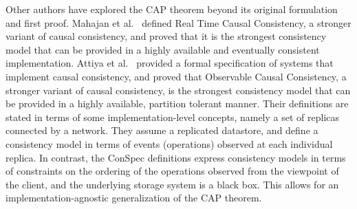 \documentclass[journal,compsoc]{IEEEtran}
\begin{document}
Other authors have explored the CAP theorem beyond its original formulation and first proof.
Mahajan et al.~\cite{mahajan11cacTR} defined Real Time Causal Consistency, a stronger variant of causal consistency, and proved that it is the strongest consistency model that can be provided in a highly available and eventually consistent implementation.
Attiya et al.~\cite{Attiya:2015:LHE:2767386.2767419}  provided a formal specification of systems that implement causal consistency, and proved that Observable Causal Consistency, a stronger variant of causal consistency, is the strongest consistency model that can be provided in a highly available, partition tolerant manner. Their definitions are stated in terms of some implementation-level concepts, namely a set of replicas connected by a network. They assume a replicated datastore, and define a consistency model in terms of events (operations) observed at each individual replica. %
 In contrast, the ConSpec definitions express consistency models in terms of constraints on the ordering of the operations observed from the viewpoint of the client, and the underlying storage system is a black box. This allows for an implementation-agnostic generalization of the CAP theorem.
\end{document}
